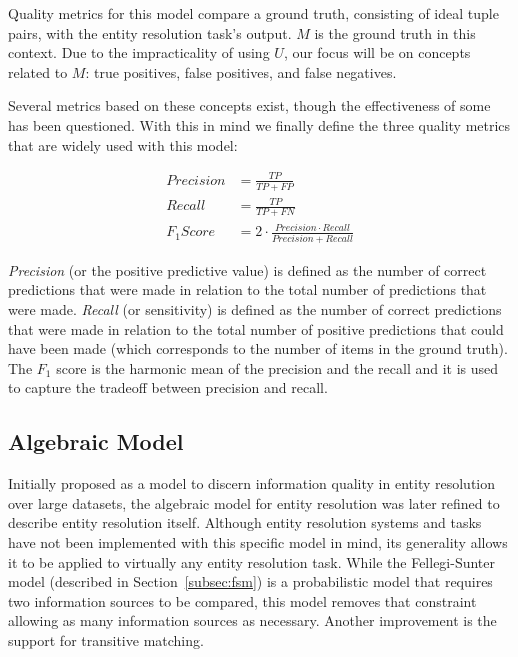 \documentclass[lettersize,journal]{IEEEtran}
\begin{document}
    Quality metrics for this model compare a ground truth, consisting of ideal
    tuple pairs, with the entity resolution task's output.
    $M$ is the ground truth in this context.
    Due to the impracticality of using $U$, our focus will be on concepts
    related to $M$: true positives, false positives, and false negatives.
    
    Several metrics based on these concepts exist, though the effectiveness of
    some has been questioned\cite{Goga2015}.
    With this in mind we finally define the three quality metrics that are
    widely used with this model:

    \begin{align}
    Precision&=\frac{TP}{TP+FP} \\
    Recall&=\frac{TP}{TP+FN} \\
    F_1 Score&=2 \cdot \frac{Precision \cdot Recall}{Precision+Recall}
    \end{align}

    \textit{Precision} (or the positive predictive value) is defined as the
    number of correct predictions that were made in relation to the total number
    of predictions that were made.
    \textit{Recall} (or sensitivity) is defined as the number of correct
    predictions that were made in relation to the total number of positive
    predictions that could have been made (which corresponds to the number of
    items in the ground truth).
    The \textit{$F_1$} score is the harmonic mean of the precision and the
    recall and it is used to capture the tradeoff between precision and
    recall\cite{hitesh2012}.

    \subsection[algebraic]{Algebraic Model}\label{subsec:algebraic}

    Initially proposed as a model to discern information quality in entity
    resolution over large datasets\cite{tal2007algebraic}, the algebraic model
    for entity resolution was later refined to describe entity resolution
    itself\cite{Tal11}.
    Although entity resolution systems and tasks have not been implemented with
    this specific model in mind, its generality allows it to be applied to
    virtually any entity resolution task.
    While the Fellegi-Sunter model (described in Section~\ref{subsec:fsm}) is a probabilistic model
    that requires two information sources to be compared, this model removes
    that constraint allowing as many information sources as necessary.
    Another improvement is the support for transitive matching.
    
\end{document}
